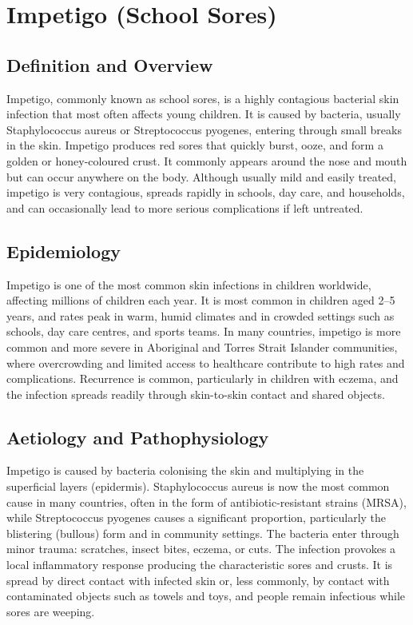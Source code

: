 \chapter{Impetigo (School Sores)}

\section*{Definition and Overview}
Impetigo, commonly known as school sores, is a highly contagious bacterial skin infection that most often affects young children. It is caused by bacteria, usually Staphylococcus aureus or Streptococcus pyogenes, entering through small breaks in the skin. Impetigo produces red sores that quickly burst, ooze, and form a golden or honey-coloured crust. It commonly appears around the nose and mouth but can occur anywhere on the body. Although usually mild and easily treated, impetigo is very contagious, spreads rapidly in schools, day care, and households, and can occasionally lead to more serious complications if left untreated.

\section*{Epidemiology}
Impetigo is one of the most common skin infections in children worldwide, affecting millions of children each year. It is most common in children aged 2--5 years, and rates peak in warm, humid climates and in crowded settings such as schools, day care centres, and sports teams. In many countries, impetigo is more common and more severe in Aboriginal and Torres Strait Islander communities, where overcrowding and limited access to healthcare contribute to high rates and complications. Recurrence is common, particularly in children with eczema, and the infection spreads readily through skin-to-skin contact and shared objects.

\section*{Aetiology and Pathophysiology}
Impetigo is caused by bacteria colonising the skin and multiplying in the superficial layers (epidermis). Staphylococcus aureus is now the most common cause in many countries, often in the form of antibiotic-resistant strains (MRSA), while Streptococcus pyogenes causes a significant proportion, particularly the blistering (bullous) form and in community settings. The bacteria enter through minor trauma: scratches, insect bites, eczema, or cuts. The infection provokes a local inflammatory response producing the characteristic sores and crusts. It is spread by direct contact with infected skin or, less commonly, by contact with contaminated objects such as towels and toys, and people remain infectious while sores are weeping.

